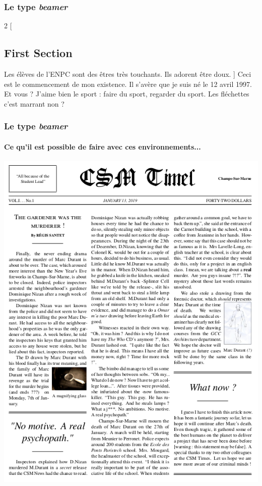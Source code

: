 \documentclass[handout]{beamer}
\begin{document}
\begin{frame}
	\frametitle{Le type \textit{beamer}}
	\centering

	\begin{multicols}{2}
	[
	\section{First Section}
	Les élèves de l'ENPC sont des êtres très touchants. Ils adorent être doux.
	]
	Ceci est le commencement de mon existence. Il s'avère que je suis né le 12 avril 1997. Et vous ? J'aime bien le sport : faire du sport, regarder du sport. Les fléchettes c'est marrant non ?
	\end{multicols}

\end{frame}

\begin{frame}
	\frametitle{Le type \textit{beamer}}
	\framesubtitle{Ce qu'il est possible de faire avec ces environnements...}
	\centering
	\includegraphics[scale=0.25]{Images/Beamer/column.png}
\end{frame}
\end{document}
